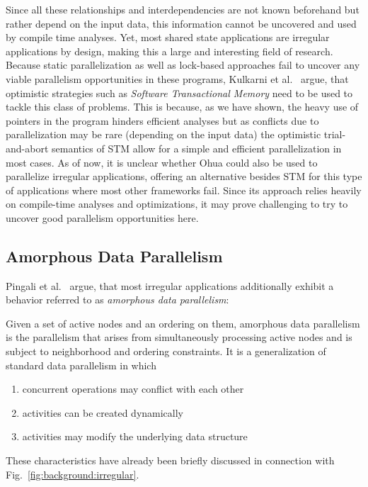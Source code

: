 Since all these relationships and interdependencies are not known beforehand but rather depend on the input data, this information cannot be uncovered and used by compile time analyses.
Yet, most shared state applications are irregular applications by design, making this a large and interesting field of research.
Because static parallelization as well as lock-based approaches fail to uncover any viable parallelism opportunities in these programs, Kulkarni et al.~\cite{kulkarni2007optimistic} argue, that optimistic strategies such as \emph{Software Transactional Memory} need to be used to tackle this class of problems.
This is because, as we have shown, the heavy use of pointers in the program hinders efficient analyses but as conflicts due to parallelization may be rare (depending on the input data) the optimistic trial-and-abort semantics of STM allow for a simple and efficient parallelization in most cases.
As of now, it is unclear whether Ohua could also be used to parallelize irregular applications, offering an alternative besides STM for this type of applications where most other frameworks fail.
Since its approach relies heavily on compile-time analyses and optimizations, it may prove challenging to try to uncover good parallelism opportunities here.


\subsection{Amorphous Data Parallelism}
\label{sec:background:irregular:adp}

Pingali et al.~\cite{pingali2009amorphous} argue, that most irregular applications additionally exhibit a behavior referred to as \emph{amorphous data parallelism}:

Given a set of active nodes and an ordering on them, amorphous data parallelism is the parallelism that arises from simultaneously processing active nodes and is subject to neighborhood and ordering constraints.
It is a generalization of standard data parallelism in which
\begin{enumerate}
    \item concurrent operations may conflict with each other
    \item activities can be created dynamically
    \item activities may modify the underlying data structure
\end{enumerate}
These characteristics have already been briefly discussed in connection with Fig.~\ref{fig:background:irregular}.


